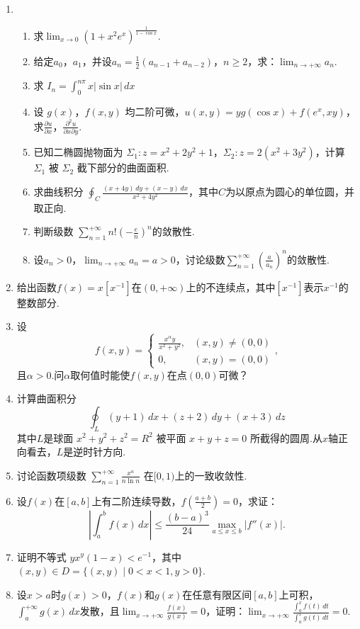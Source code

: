 \documentclass{article}
\begin{document}
\begin{enumerate}
\item
\begin{enumerate}
\item
求$\displaystyle\lim_{x\to 0}\left(1+x^2e^x\right)^{\frac{1}{1-\cos x}}$.
\item
给定$a_0$，$a_1$，并设$\displaystyle a_n=\frac{1}{2}\left(a_{n-1}+a_{n-2}\right)$，$n\ge 2$，求：$\displaystyle \lim_{n\to+\infty}a_n$.
\item
求 $\displaystyle I_n=\int_{0}^{n\pi}x|\sin x|\,dx$
\item 设 $g(x)$，$f(x,y)$ 均二阶可微，$u(x,y)=yg(\cos x)+f(e^x,xy)$，求$\displaystyle \frac{\partial u}{\partial x}$，$\displaystyle\frac{\partial^2 u}{\partial x\partial y}$.
\item
已知二椭圆抛物面为 $\Sigma_1:z=x^2+2y^2+1$，$\Sigma_2:z=2(x^2+3y^2)$，计算 $\Sigma_1$ 被 $\Sigma_2$  截下部分的曲面面积.
\item
求曲线积分 $\displaystyle \oint_{C}\frac{(x+4y)\,dy+(x-y)\,dx}{x^2+4y^2}$，其中$C$为以原点为圆心的单位圆，并取正向.
\item
判断级数 $\displaystyle \sum_{n=1}^{+\infty}n!\left(-\frac{e}{n}\right)^n$的敛散性.
\item
设$a_n>0$，$\displaystyle \lim_{n\to+\infty}a_n=a>0$，讨论级数$\displaystyle \sum_{n=1}^{+\infty}\left(\frac{a}{a_n}\right)^n$的敛散性.
\end{enumerate}
\item
给出函数$f(x)=x[x^{-1}]$在$(0,+\infty)$上的不连续点，其中$[x^{-1}]$表示$x^{-1}$的整数部分.
\item
设
\[
f(x,y)=
\begin{cases}
\displaystyle\frac{x^\alpha y}{x^2+y^2},&(x,y)\ne(0,0)\\
0,&(x,y)=(0,0)
\end{cases},
\]
且$\alpha>0$.问$\alpha$取何值时能使$f(x,y)$在点$(0,0)$可微？
\item
计算曲面积分
\[
\oint_L(y+1)\,dx+(z+2)\,dy+(x+3)\,dz
\]
其中$L$是球面 $x^2+y^2+z^2=R^2$ 被平面 $x+y+z=0$ 所截得的圆周.从$x$轴正向看去，$L$是逆时针方向.
\item
讨论函数项级数 $\displaystyle \sum_{n=1}^{+\infty}\frac{x^n}{n\ln n}$ 在$[0,1)$上的一致收敛性.
\item 设$f(x)$在$[a,b]$上有二阶连续导数，$\displaystyle f\left(\frac{a+b}{2}\right)=0$，求证：
\[
\left|\int_{a}^{b}f(x)\,dx\right|\le\frac{(b-a)^3}{24}\max_{a\le x\le b}\left|f''(x)\right|.
\]
\item 证明不等式 $yx^y(1-x)<e^{-1}$，其中$(x,y)\in D=\{(x,y)\mid 0<x<1,y>0\}$.
\item 设$x>a$时$g(x)>0$，$f(x)$和$g(x)$在任意有限区间$[a,b]$上可积，$\displaystyle \int_{a}^{+\infty}g(x)\,dx$发散，且$\displaystyle \lim_{x\to+\infty}\frac{f(x)}{g(x)}=0$，证明：$\displaystyle \lim_{x\to+\infty}\frac{\displaystyle\int_a^xf(t)\,dt}{\displaystyle\int_a^xg(t)\,dt}=0$.
\end{enumerate}
\end{document}
